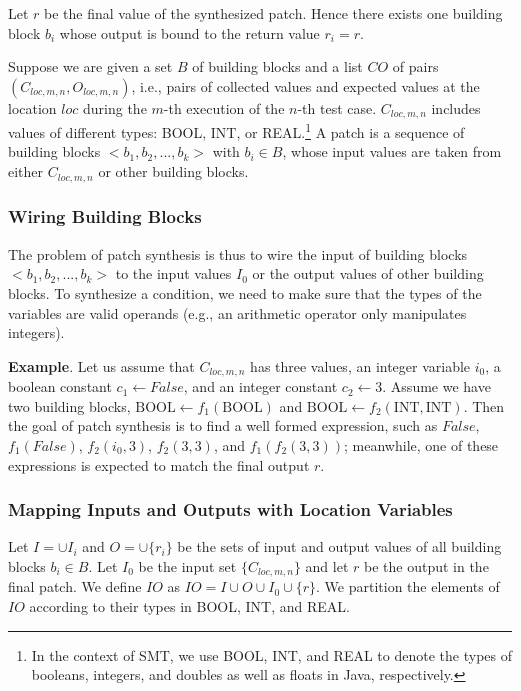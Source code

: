 Let $r$ be the final value of the synthesized patch. Hence there exists one building block $b_i$ whose output is bound to the return value $r_i = r$.

Suppose we are given a set $B$ of building blocks and a list $CO$ of pairs $(C_{loc,m,n},O_{loc,m,n})$, i.e., pairs of collected values and expected values at the location $loc$ during the $m$-th execution of the $n$-th test case. $C_{loc,m,n}$ includes values of different types: BOOL, INT, or REAL.\footnote{In the context of SMT, we use BOOL, INT, and REAL to denote the types of booleans, integers, and doubles as well as floats in Java, respectively.} A patch is a sequence of building blocks $<b_1,b_2,...,b_k>$ with $b_i \in B$, whose input values are taken from either $C_{loc,m,n}$ or other building blocks. 

\subsubsection{Wiring Building Blocks}
\label{subsubsect:wiring}

The problem of patch synthesis is thus to wire the input of building blocks $<b_1,b_2,...,b_k>$ to the input values $I_0$ or the output values of other building blocks. To synthesize a condition, we need to make sure that the types of the variables are valid operands (e.g., an arithmetic operator only manipulates integers). 

\textbf{Example}. Let us assume that $C_{loc,m,n}$ has three values, an integer variable $i_0$, a boolean constant $c_1 \leftarrow False$, and an integer constant $c_2 \leftarrow 3$. Assume we have two building blocks,  $\mbox{BOOL} \leftarrow f_1(\mbox{BOOL})$ and 
$\mbox{BOOL} \leftarrow f_2(\mbox{INT}, \mbox{INT})$. 
Then the goal of patch synthesis is to find a well formed expression, such as $False$, $f_1(False)$, $f_2(i_0, 3)$, $f_2(3,3)$, and $f_1(f_2(3,3))$; meanwhile, one of these expressions is expected to match the final output $r$. 

\subsubsection{Mapping Inputs and Outputs with Location Variables}

Let $I = \cup I_i$ and $O = \cup \{r_i\}$ be the sets of input and output values of all building blocks $b_i \in B$. 
Let $I_0$ be the input set $\{ C_{loc,m,n} \}$ and let $r$ be the output in the final patch.
We define $IO$ as $IO = I \cup O \cup I_0 \cup \{ r \}$. 
We partition the elements of $IO$ according to their types in BOOL, INT, and REAL.

